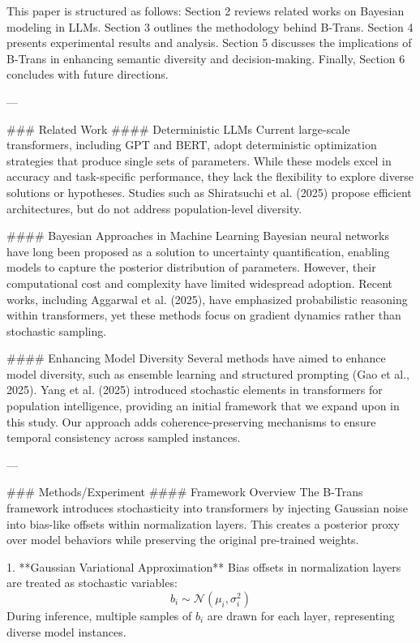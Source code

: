 This paper is structured as follows: Section 2 reviews related works on Bayesian modeling in LLMs. Section 3 outlines the methodology behind B-Trans. Section 4 presents experimental results and analysis. Section 5 discusses the implications of B-Trans in enhancing semantic diversity and decision-making. Finally, Section 6 concludes with future directions.

---

### Related Work  
#### Deterministic LLMs  
Current large-scale transformers, including GPT and BERT, adopt deterministic optimization strategies that produce single sets of parameters. While these models excel in accuracy and task-specific performance, they lack the flexibility to explore diverse solutions or hypotheses. Studies such as Shiratsuchi et al. (2025) propose efficient architectures, but do not address population-level diversity.

#### Bayesian Approaches in Machine Learning  
Bayesian neural networks have long been proposed as a solution to uncertainty quantification, enabling models to capture the posterior distribution of parameters. However, their computational cost and complexity have limited widespread adoption. Recent works, including Aggarwal et al. (2025), have emphasized probabilistic reasoning within transformers, yet these methods focus on gradient dynamics rather than stochastic sampling.

#### Enhancing Model Diversity  
Several methods have aimed to enhance model diversity, such as ensemble learning and structured prompting (Gao et al., 2025). Yang et al. (2025) introduced stochastic elements in transformers for population intelligence, providing an initial framework that we expand upon in this study. Our approach adds coherence-preserving mechanisms to ensure temporal consistency across sampled instances.

---

### Methods/Experiment  
#### Framework Overview  
The B-Trans framework introduces stochasticity into transformers by injecting Gaussian noise into bias-like offsets within normalization layers. This creates a posterior proxy over model behaviors while preserving the original pre-trained weights.

1. **Gaussian Variational Approximation**  
   Bias offsets in normalization layers are treated as stochastic variables:  
   \[
   b_{i} \sim \mathcal{N}(\mu_{i}, \sigma_{i}^{2})
   \]  
   During inference, multiple samples of \(b_{i}\) are drawn for each layer, representing diverse model instances.

